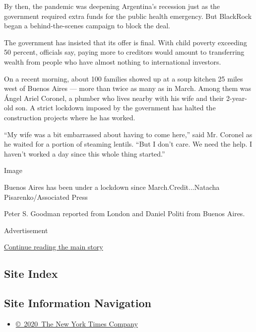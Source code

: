 By then, the pandemic was deepening Argentina's recession just as the
government required extra funds for the public health emergency. But
BlackRock began a behind-the-scenes campaign to block the deal.

The government has insisted that its offer is final. With child poverty
exceeding 50 percent, officials say, paying more to creditors would
amount to transferring wealth from people who have almost nothing to
international investors.

On a recent morning, about 100 families showed up at a soup kitchen 25
miles west of Buenos Aires --- more than twice as many as in March.
Among them was Ángel Ariel Coronel, a plumber who lives nearby with his
wife and their 2-year-old son. A strict lockdown imposed by the
government has halted the construction projects where he has worked.

``My wife was a bit embarrassed about having to come here,'' said Mr.
Coronel as he waited for a portion of steaming lentils. ``But I don't
care. We need the help. I haven't worked a day since this whole thing
started.''

Image

Buenos Aires has been under a lockdown since March.Credit...Natacha
Pisarenko/Associated Press

Peter S. Goodman reported from London and Daniel Politi from Buenos
Aires.

Advertisement

\protect\hyperlink{after-bottom}{Continue reading the main story}

\hypertarget{site-index}{%
\subsection{Site Index}\label{site-index}}

\hypertarget{site-information-navigation}{%
\subsection{Site Information
Navigation}\label{site-information-navigation}}

\begin{itemize}
\tightlist
\item
  \href{https://help.nytimes3xbfgragh.onion/hc/en-us/articles/115014792127-Copyright-notice}{©~2020~The
  New York Times Company}
\end{itemize}

